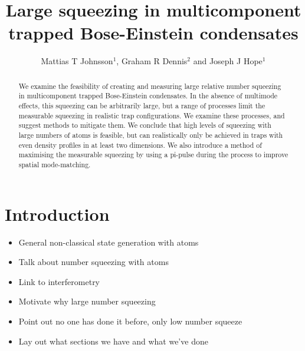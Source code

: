 \documentclass{iopart}
\begin{document}
\title{Large squeezing in multicomponent trapped Bose-Einstein condensates}

\author{Mattias T Johnsson$^1$, Graham R Dennis$^2$ and Joseph J Hope$^1$}

\address{$^1$Department of Quantum Science, Research School of Physics and Engineering, The Australian National University, Canberra ACT 0200, Australia}
\address{$^2$Plasma Research Laboratory, Research School of Physics and Engineering, The Australian National University, Canberra ACT 0200, Australia}

\begin{abstract}
We examine the feasibility of creating and measuring large relative number squeezing in multicomponent trapped Bose-Einstein condensates.  In the absence of multimode effects, this squeezing can be arbitrarily large, but a range of processes limit the measurable squeezing in realistic trap configurations.  We examine these processes, and suggest methods to mitigate them. We conclude that high levels of squeezing with large numbers of atoms is feasible, but can realistically only be achieved in traps with even density profiles in at least two dimensions. We also introduce a method of maximising the measurable squeezing by using a pi-pulse during the process to improve spatial mode-matching.
\end{abstract}

\maketitle

\section{Introduction}
\label{sectionIntroduction}
\begin{itemize}
  \item General non-classical state generation with atoms
  \item Talk about number squeezing with atoms
  \item Link to interferometry
  \item Motivate why large number squeezing
  \item Point out no one has done it before, only low number squeeze
  \item Lay out what sections we have and what we've done
\end{itemize}
\end{document}
